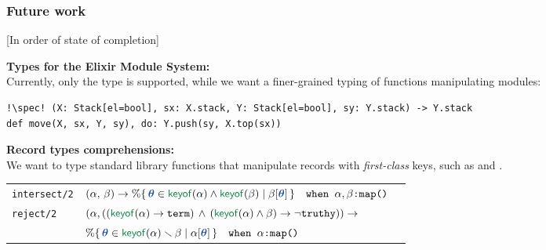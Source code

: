 \begin{frame}[fragile]
\frametitle{Future work}\vspace{-2mm}[In order of state of completion]

\bigskip
\textbf{\color{darkslateblue}Types for the Elixir Module System:}\\
Currently, only the type  is supported, while we want a finer-grained typing of functions manipulating modules:\vspace{-5mm}
\begin{block}{\vspace{-25mm}}
\begin{verbatim}
!\spec! (X: Stack[el=bool], sx: X.stack, Y: Stack[el=bool], sy: Y.stack) -> Y.stack
def move(X, sx, Y, sy), do: Y.push(sy, X.top(sx))   
\end{verbatim}
\end{block}

\bigskip
\textbf{\color{darkslateblue}Record types comprehensions:}\\
We want to type standard library functions that manipulate records with \emph{first-class} keys, such as  and .
\newcommand{\keyof}[1]{\textcolor{typeconstructorgreen}{\mathsf{keyof}}(#1)}
\newcommand{\tvar}{\textcolor{keyvarblue}{\boldsymbol{\theta}}}
\begin{tabular}{@{}l@{\;\;}l@{\;\;}l@{}}
 \texttt{intersect/2}
  & $(\alpha,\, \beta) \to \%\{\,\tvar \in \keyof{\alpha} \land \keyof{\beta} \mid \beta[\tvar]\,\}\quad\texttt{when } \alpha,\beta\texttt{:map()}$  \\[6pt]
\texttt{reject/2}
  & $(\alpha, ((\keyof{\alpha} \to \texttt{term}) \,\wedge\, ( \keyof{\alpha}\wedge\beta)\to\neg\texttt{truthy})) \to $\\
  &\qquad\qquad\qquad\qquad
     $\%\{\, \tvar\in \keyof{\alpha}\setminus\beta \mid \alpha[\tvar]\,\} \quad\texttt{when } \alpha\texttt{:map()}$\\[3pt]
\end{tabular}
\end{frame}
